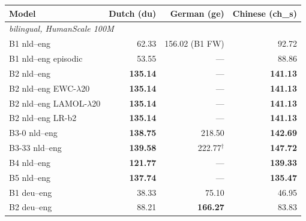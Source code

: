 \begin{table}[!ht]
  \centering
  \scriptsize
  \setlength{\tabcolsep}{4pt}
  \label{tab:meco_full_canonical}
  \begin{tabular}{lrrr}
    \toprule
    Model & Dutch (du) & German (ge) & Chinese (ch\_s) \\
    \midrule
    \multicolumn{4}{l}{\textit{\beetle{} bilingual, HumanScale 100M}} \\
    \midrule
    B1 nld--eng           & 62.33 & 156.02 (B1 FW) & 92.72 \\
    B1 nld--eng episodic  & 53.55 & --- & 88.86 \\
    B2 nld--eng           & \textbf{135.14} & --- & \textbf{141.13} \\
    B2 nld--eng EWC-$\lambda$20 & \textbf{135.14} & --- & \textbf{141.13} \\
    B2 nld--eng LAMOL-$\lambda$20 & \textbf{135.14} & --- & \textbf{141.13} \\
    B2 nld--eng LR-b2     & \textbf{135.14} & --- & \textbf{141.13} \\
    B3-0 nld--eng         & \textbf{138.75} & 218.50 & \textbf{142.69} \\
    B3-33 nld--eng        & \textbf{139.58} & 222.77$^{\dagger}$ & \textbf{147.72} \\
    B4 nld--eng           & \textbf{121.77} & --- & \textbf{139.33} \\
    B5 nld--eng           & \textbf{137.74} & --- & \textbf{135.47} \\
    B1 deu--eng           & 38.33 & 75.10 & 46.95 \\
    B2 deu--eng           & 88.21 & \textbf{166.27} & 83.83 \\

\end{tabular}
\end{table}
